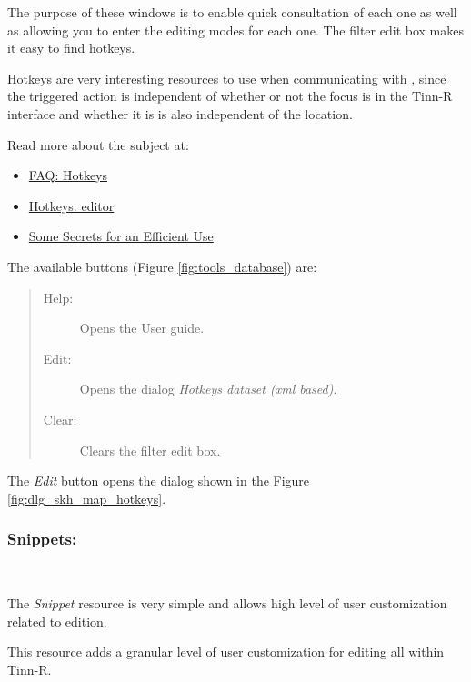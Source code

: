 The purpose of these windows is to enable quick consultation of each one as well as allowing you
to enter the editing modes for each one. The filter edit box makes it easy to find hotkeys.

Hotkeys are very interesting resources to use when communicating with \RR{}, since the triggered action
is independent of whether or not the focus is in the Tinn-R interface and whether it is is
also independent of the location.

Read more about the subject at:
\begin{itemize}
  \item \href{\#faq\_hotkeys}{FAQ: Hotkeys}
  \item \href{\#dlg\_hotkeys\_editor}{Hotkeys: editor}
  \item \href{\#secrets\_after\_installation}{Some Secrets for an Efficient Use}
\end{itemize}

The available buttons
(Figure \ref{fig:tools_database})
are:

\begin{quote}
  \begin{footnotesize}
    \begin{description}
      \item[Help:]
        Opens the User guide.
      \item[Edit:]
        Opens the dialog \textit{Hotkeys dataset (xml based)}.
      \item [Clear:]
        Clears the filter edit box.
    \end{description}
  \end{footnotesize}
\end{quote}

The \textit{Edit} button opens the dialog shown in the Figure \ref{fig:dlg_skh_map_hotkeys}.


\subsubsection{Snippets:}\\

The \textit{Snippet} resource is very simple and allows high level
of user customization related to edition.

This resource adds a granular level of user customization for editing
all within Tinn-R.

